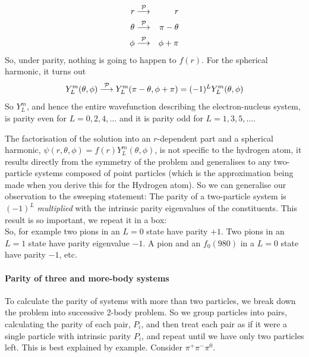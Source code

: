  \begin{eqnarray}
    r & \stackrel{\mathcal{P}}{\longrightarrow} & r \nonumber\\
    \theta & \stackrel{\mathcal{P}}{\longrightarrow} & \pi - \theta \nonumber \\
    \phi & \stackrel{\mathcal{P}}{\longrightarrow} & \phi + \pi
 \end{eqnarray}
 So, under parity, nothing is going to happen to $f(r)$. For the spherical harmonic, it turns out
 \begin{equation}
  Y^{m}_{L}(\theta, \phi) \stackrel{\mathcal{P}}{\longrightarrow} 
  Y^{m}_{L}(\pi-\theta, \phi+\pi)
  = (-1)^L Y^{m}_{L}(\theta, \phi)
 \end{equation}
 So $Y^{m}_{L}$, and hence the entire wavefunction describing the electron-nucleus system, is parity even for $L=0, 2, 4, \ldots$ and it is parity odd for $L=1, 3, 5, \ldots$. 
 
 
 The factorisation of the solution into an $r$-dependent part and a spherical harmonic, $\psi(r, \theta, \phi) = f(r) Y^{m}_{L}(\theta, \phi)$, is not specific to the hydrogen atom, it results directly from the symmetry of the problem and generalises to any two-particle systems composed of point particles (which is the approximation being made when you derive this for the Hydrogen atom).
 So we can generalise our observation to the sweeping statement: The parity of a two-particle system is $(-1)^L$ \emph{multiplied} with the intrinsic parity eigenvalues of the constituents. This result is so important, we repeat it in a box:\\
So, for example two pions in an $L=0$ state have parity $+1$. Two pions in an $L=1$ state have parity eigenvalue $-1$. A pion and an $f_0(980)$ in a $L=0$ state have parity $-1$, etc.

\paragraph{Parity of three and more-body systems}
To calculate the parity of systems with more than two particles, we break down the problem into successive 2-body problem. So we group particles into pairs, calculating the parity of each pair, $P_i$, and then treat each pair as if it were a single particle with intrinsic parity $P_i$, and repeat until we have only two particles left. This is best explained by example. Consider $\pi^+ \pi^- \pi^0$.

